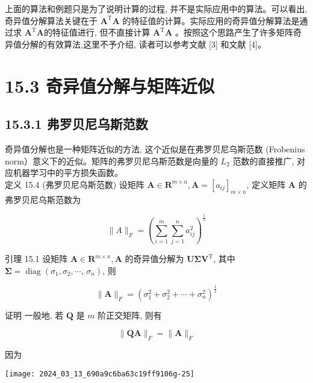 \documentclass[10pt]{article}
\begin{document}
上面的算法和例题只是为了说明计算的过程, 并不是实际应用中的算法。可以看出, 奇异值分解算法关键在于 $\boldsymbol{A}^{\mathrm{T}} \boldsymbol{A}$ 的特征值的计算。实际应用的奇异值分解算法是通过求 $\boldsymbol{A}^{\mathrm{T}} \boldsymbol{A}$的特征值进行, 但不直接计算 $\boldsymbol{A}^{\mathrm{T}} \boldsymbol{A}$ 。按照这个思路产生了许多矩阵奇异值分解的有效算法,这里不予介绍, 读者可以参考文献 [3] 和文献 [4]。

\section*{15.3 奇异值分解与矩阵近似}
\subsection*{15.3.1 弗罗贝尼乌斯范数}
奇异值分解也是一种矩阵近似的方法, 这个近似是在弗罗贝尼乌斯范数 (Frobenius norm）意义下的近似。矩阵的弗罗贝尼乌斯范数是向量的 $L_{2}$ 范数的直接推广, 对应机器学习中的平方损失函数。\\
定义 15.4 (弗罗贝尼乌斯范数) 设矩阵 $\boldsymbol{A} \in \boldsymbol{R}^{m \times n}, \boldsymbol{A}=\left[a_{i j}\right]_{m \times n}$, 定义矩阵 $\boldsymbol{A}$ 的弗罗贝尼乌斯范数为


\begin{equation*}
\|A\|_{F}=\left(\sum_{i=1}^{m} \sum_{j=1}^{n} a_{i j}^{2}\right)^{\frac{1}{2}} \tag{15.25}
\end{equation*}


引理 15.1 设矩阵 $\boldsymbol{A} \in \boldsymbol{R}^{m \times n}, \boldsymbol{A}$ 的奇异值分解为 $\boldsymbol{U} \boldsymbol{\Sigma} \boldsymbol{V}^{\mathrm{T}}$, 其中 $\boldsymbol{\Sigma}=\operatorname{diag}\left(\sigma_{1}, \sigma_{2}, \cdots\right.$, $\left.\sigma_{n}\right)$, 则


\begin{equation*}
\|\boldsymbol{A}\|_{F}=\left(\sigma_{1}^{2}+\sigma_{2}^{2}+\cdots+\sigma_{n}^{2}\right)^{\frac{1}{2}} \tag{15.26}
\end{equation*}


证明 一般地, 若 $\boldsymbol{Q}$ 是 $m$ 阶正交矩阵, 则有


\begin{equation*}
\|\boldsymbol{Q} \boldsymbol{A}\|_{F}=\|\boldsymbol{A}\|_{F} \tag{15.27}
\end{equation*}


因为

\begin{center}
\texttt{[image: 2024\_03\_13\_690a9c6ba63c19ff9106g-25]}
\end{center}
\end{document}
